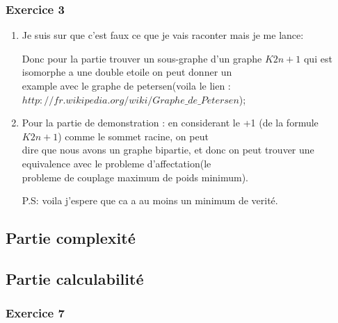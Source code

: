 \documentclass[]{article}
\begin{document}
\subsubsection{Exercice 3}

\begin{enumerate}


\item Je suis sur que c'est faux ce que je vais raconter mais je me lance:

Donc pour la partie trouver un sous-graphe d'un graphe $K2n+1$ qui est isomorphe a une double etoile on peut donner un\\
example avec le graphe de petersen(voila le lien : $http://fr.wikipedia.org/wiki/Graphe\_de\_Petersen$);

\item Pour la partie de demonstration : en considerant le +1 (de la formule $K2n+1$) comme le sommet racine, on peut \\
dire que nous avons un graphe bipartie, et donc on peut trouver une equivalence avec le probleme d'affectation(le \\
probleme de couplage maximum de poids minimum).



P.S: voila j'espere que ca a au moins un minimum de verité.
\end{enumerate}


\subsection{Partie complexité}
\subsection{Partie calculabilité}



\subsubsection{Exercice 7}

\noindent{}\\\\
\end{document}
